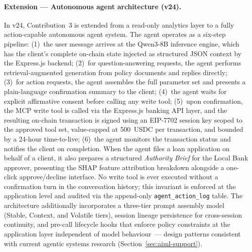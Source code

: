 \documentclass[12pt,a4paper]{report}
\begin{document}
\begin{description}[leftmargin=0pt]
\paragraph{Extension --- Autonomous agent architecture (v24).}
In v24, Contribution~3 is extended from a read-only analytics layer to a fully action-capable autonomous agent system. The agent operates as a six-step pipeline: (1)~the user message arrives at the Qwen3-8B inference engine, which has the client's complete on-chain state injected as structured JSON context by the Express.js backend; (2)~for question-answering requests, the agent performs retrieval-augmented generation from policy documents and replies directly; (3)~for action requests, the agent assembles the full parameter set and presents a plain-language confirmation summary to the client; (4)~the agent waits for explicit affirmative consent before calling any write tool; (5)~upon confirmation, the MCP write tool is called via the Express.js banking API layer, and the resulting on-chain transaction is signed using an EIP-7702 session key scoped to the approved tool set, value-capped at 500~USDC per transaction, and bounded by a 24-hour time-to-live; (6)~the agent monitors the transaction status and notifies the client on completion. When the agent files a loan application on behalf of a client, it also prepares a structured \textit{Authority Brief} for the Local Bank approver, presenting the SHAP feature attribution breakdown alongside a one-click approve/decline interface. No write tool is ever executed without a confirmation turn in the conversation history; this invariant is enforced at the application level and audited via the append-only \texttt{agent\_action\_log} table. The architecture additionally incorporates a three-tier prompt assembly model (Stable, Context, and Volatile tiers), session lineage persistence for cross-session continuity, and pre-call lifecycle hooks that enforce policy constraints at the application layer independent of model behaviour~--- design patterns consistent with current agentic systems research (Section~\ref{sec:aiml-support}).


\end{description}
\end{document}
